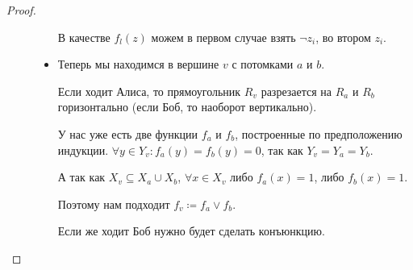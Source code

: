\begin{proof}
\begin{description}
\begin{itemize}
					В качестве $ f_{l}(z) $ можем в первом случае взять $ \neg z_i$, во втором $z_i$.
				\item Теперь мы находимся в вершине $ v$ с потомками  $ a $ и $ b$.

					Если ходит Алиса, то прямоугольник  $ R_v$ разрезается на   $ R_a$ и  $ R_b$ горизонтально (если  Боб, то наоборот вертикально).

					У нас уже есть две функции  $ f_a$ и  $ f_b$, построенные по предположению индукции.  $ \forall y \in Y_v\colon  f_a(y) = f_b(y) = 0$, так как $ Y_v = Y_a = Y_b$.

					А так как $ X_v \subseteq X_a \cup X_b$, $ \forall x \in X_v$ либо $ f_a(x) = 1$, либо  $ f_b(x) = 1$.

					Поэтому нам подходит  $ f_v \coloneqq f_a \vee f_b$.

					Если же ходит Боб нужно будет сделать конъюнкцию.
			\end{itemize}
    \end{description} 
\end{proof}
